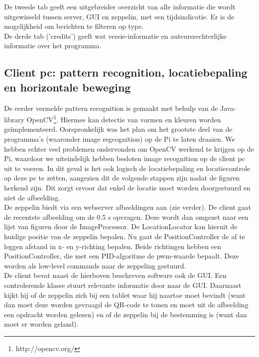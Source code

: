 \documentclass[eind]{penoverslag}
\begin{document}
De tweede tab geeft een uitgebreider overzicht van alle informatie die wordt uitgewisseld tussen server, GUI en zeppelin, met een tijdsindicatie. Er is de mogelijkheid om berichten te filteren op type. \\

De derde tab ('credits') geeft wat versie-informatie en auteursrechterlijke informatie over het programma.

\subsection{Client pc: pattern recognition, locatiebepaling en horizontale beweging}
De eerder vermelde pattern recognition is gemaakt met behulp van de Java-library OpenCV\footnote{http://opencv.org/}. Hiermee kan detectie van vormen en kleuren worden ge\"{i}mplementeerd. Oorspronkelijk was het plan om het grootste deel van de programma's (waaronder image regcognition) op de Pi te laten draaien. We hebben echter veel problemen ondervonden om OpenCV werkend te krijgen op de Pi, waardoor we uiteindelijk hebben besloten image recognition op de client pc uit te voeren. In dit geval is het ook logisch de locatiebepaling en locatiecontrole op deze pc te zetten, aangezien dit de volgende stappen zijn nadat de figuren herkend zijn. Dit zorgt ervoor dat enkel de locatie moet worden doorgestuurd en niet de afbeelding.\\

De zeppelin biedt via een webserver afbeeldingen aan (zie verder). De client gaat de recentste afbeelding om de 0.5 s opvragen. Deze wordt dan omgezet naar een lijst van figuren door de ImageProcessor. De LocationLocator kan hieruit de huidige positie van de zeppelin bepalen. Nu gaat de PositionController de af te leggen afstand in x- en y-richting bepalen. Beide richtingen hebben een PositionController, die met een PID-algoritme de pwm-waarde bepaalt. Deze worden als low-level commands naar de zeppeling gestuurd.\\

De client bevat naast de hierboven beschreven software ook de GUI. Een controlerende klasse stuurt relevante informatie door naar de GUI. Daarnaast kijkt hij of de zeppelin zich bij een tablet waar hij naartoe moet bevindt (want dan moet deze worden gevraagd de QR-code te tonen en moet uit de afbeelding een opdracht worden gelezen) en of de zeppelin bij de bestemming is (want dan moet er worden geland).\\
\end{document}
